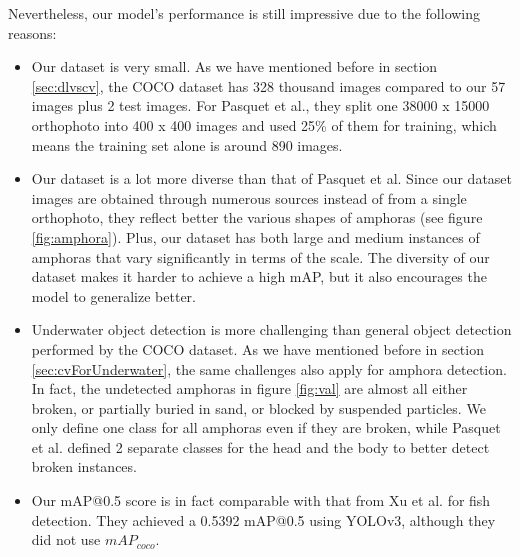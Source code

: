 \documentclass[a4paper, 11pt, oneside]{article}
\begin{document}
  Nevertheless, our model's performance is still impressive due to the following reasons:

  \begin{itemize}
    \item Our dataset is very small. As we have mentioned before in section \ref{sec:dlvscv}, the COCO dataset has 328
    thousand images compared to our 57 images plus 2 test images. For Pasquet et al., they split one 38000 x 15000
    orthophoto into 400 x 400 images and used 25\% of them for training, which means the training set alone is around
    890 images.
    \item Our dataset is a lot more diverse than that of Pasquet et al. Since our dataset images are obtained through
    numerous sources instead of from a single orthophoto, they reflect better the various shapes of amphoras (see
    figure \ref{fig:amphora}). Plus, our dataset has both large and medium instances of amphoras that vary significantly
    in terms of the scale. The diversity of our dataset makes it harder to achieve a high mAP, but it also encourages
    the model to generalize better.
    \item Underwater object detection is more challenging than general object detection performed by the COCO dataset.
    As we have mentioned before in section \ref{sec:cvForUnderwater}, the same challenges also apply for amphora
    detection. In fact, the undetected amphoras in figure \ref{fig:val} are almost all either broken, or partially buried
    in sand, or blocked by suspended particles. We only define one class for all amphoras even if they are broken, while
    Pasquet et al. defined 2 separate classes for the head and the body to better detect broken instances.
    \item Our mAP@0.5 score is in fact comparable with that from Xu et al. \cite{xu2018underwater} for fish detection.
    They achieved a 0.5392 mAP@0.5 using YOLOv3, although they did not use $mAP_{coco}$.
  \end{itemize}
\end{document}

